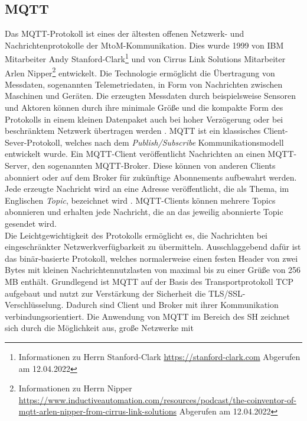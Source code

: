     \subsection{MQTT}
    \label{subsec:mqtt}
        Das \ac{MQTT}-Protokoll ist eines der ältesten offenen Netzwerk- und Nachrichtenprotokolle der 
        \ac{MtoM}-Kommunikation. 
        Dies wurde 1999 von IBM Mitarbeiter Andy Stanford-Clark\footnote{Informationen zu Herrn Stanford-Clark \url{https://stanford-clark.com} Abgerufen am 12.04.2022} 
        und von Cirrus Link Solutions Mitarbeiter Arlen Nipper\footnote{Informationen zu Herrn Nipper \url{https://www.inductiveautomation.com/resources/podcast/the-coinventor-of-mqtt-arlen-nipper-from-cirrus-link-solutions} Abgerufen am 12.04.2022} 
        entwickelt. Die Technologie ermöglicht die Übertragung von Messdaten, sogenannten Telemetriedaten, in Form von 
        Nachrichten zwischen Maschinen und Geräten. Die erzeugten Messdaten durch beispielsweise Sensoren und Aktoren 
        können durch ihre minimale Größe und die kompakte Form des Protokolls in einem kleinen Datenpaket auch bei 
        hoher Verzögerung oder bei beschränktem Netzwerk übertragen werden \cite{Naik2017}. \acs{MQTT} ist ein 
        klassisches Client-Sever-Protokoll, welches nach dem \textit{Publish/Subscribe} Kommunikationsmodell 
        entwickelt wurde. Ein \acs{MQTT}-Client veröffentlicht Nachrichten an einen \acs{MQTT}-Server, den sogenannten 
        \acs{MQTT}-Broker. Diese können von anderen Clients abonniert oder auf dem Broker für zukünftige Abonnements 
        aufbewahrt werden. Jede erzeugte Nachricht wird an eine Adresse veröffentlicht, die als Thema, im Englischen \textit{Topic}, 
        bezeichnet wird \cite{Naik2017}. \acs{MQTT}-Clients können mehrere Topics abonnieren und erhalten jede Nachricht, die an das jeweilig abonnierte Topic gesendet wird. 
        \\
        Die Leichtgewichtigkeit des Protokolls ermöglicht es, die Nachrichten bei eingeschränkter Netzwerkverfügbarkeit zu 
        übermitteln. Ausschlaggebend dafür ist das binär-basierte Protokoll, welches normalerweise einen festen Header von 
        zwei Bytes mit kleinen Nachrichtennutzlasten von maximal bis zu einer Grüße von 256 MB \cite{Naik2017} enthält. Grundlegend 
        ist \acs{MQTT} auf der Basis des Transportprotokoll \ac{TCP} aufgebaut und nutzt zur Verstärkung der Sicherheit die 
        \ac{TLS}/\ac{SSL}-Verschlüsselung. Dadurch sind Client und Broker mit ihrer Kommunikation verbindungsorientiert.  
        Die Anwendung von \acs{MQTT} im Bereich des \acl{SH} zeichnet sich durch die Möglichkeit aus, große Netzwerke mit 
